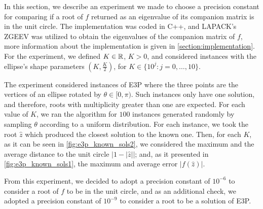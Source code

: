 In this section, we describe an experiment we made to choose a precision constant for comparing if a root of $f$ returned as an eigenvalue of its companion matrix is in the unit circle. The implementation was coded in C++, and LAPACK's ZGEEV was utilized to obtain the eigenvalues of the companion matrix of $f$, more information about the implementation is given in \autoref{section:implementation}. For the experiment, we defined $K\in\mathbb{R}$, $K>0$, and considered instances with the ellipse's shape parameters $(K, \frac{K}{2})$, for $K\in\{10^j\colon j=0,\dots,10\}$.

The experiment considered instances of E3P where the three points are the vertices of an ellipse rotated by $\theta\in[0, \pi)$. Such instances only have one solution, and therefore, roots with multiplicity greater than one are expected.
For each value of $K$, we ran the algorithm for $100$ instances generated randomly by sampling $\theta$ according to a uniform distribution. For each instance, we took the root $\hat{z}$ which produced the closest solution to the known one. Then, for each $K$, as it can be seen in \autoref{fig:e3p_known_sols2}, we considered the maximum and the average distance to the unit circle $|1-|\hat{z}||$; and, as it presented in \autoref{fig:e3p_known_sols1}, the maximum and average error $|f(\hat{z})|$.

From this experiment, we decided to adopt a precision constant of $10^{-6}$ to consider a root of $f$ to be in the unit circle, and as an additional check, we adopted a precision constant of $10^{-9}$ to consider a root to be a solution of E3P.

